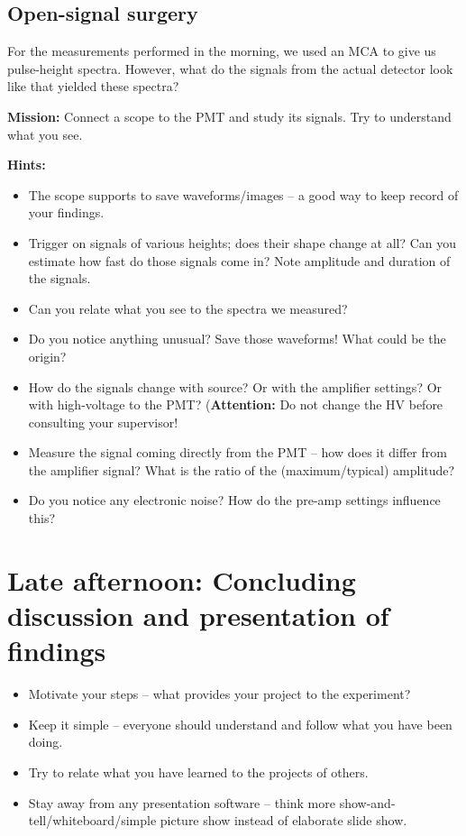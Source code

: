 \documentclass[a4,11pt, notitlepage]{article}
\begin{document}
\subsection{Open-signal surgery}
\label{sec:}
For the measurements performed in the morning, we used an MCA to
give us pulse-height spectra. However, what do the signals from the
actual detector look like that yielded these spectra?

\noindent\textbf{Mission:} Connect a scope to the PMT and study its
signals. Try to understand what you see.

\noindent\textbf{Hints:}
\begin{itemize}
\item The scope supports to save waveforms/images -- a good way to
  keep record of your findings.
\item Trigger on signals of various heights; does their shape change
  at all? Can you estimate how fast do those signals come in? Note
  amplitude and duration of the signals.
\item Can you relate what you see to
the spectra we measured?
\item Do you notice anything unusual? Save those waveforms! What could
  be the origin?
\item How do the signals change with source? Or with the amplifier
  settings? Or with high-voltage to the
  PMT? (\textbf{Attention:} Do not change the HV before consulting
  your supervisor!
\item Measure the signal coming directly from the PMT -- how does it
  differ from the amplifier signal? What is the ratio of the
  (maximum/typical) amplitude?
\item Do you notice any electronic noise? How do the pre-amp settings
  influence this?
\end{itemize}


\section{Late afternoon: Concluding discussion and presentation of findings}
\label{sec:final-presentation}

\begin{itemize}
\item Motivate your steps -- what provides your project to the experiment?
\item Keep it simple -- everyone should understand and follow what you
  have been doing.
\item Try to relate what you have learned to the projects of
  others.
\item Stay away from any presentation software -- think more
  show-and-tell/whiteboard/simple picture show instead of elaborate slide show.

\end{itemize}
\end{document}
